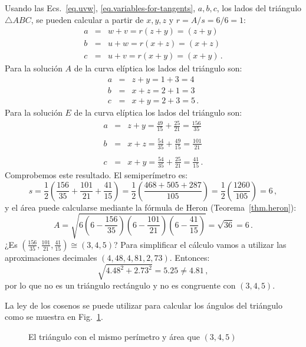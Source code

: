Usando las Ecs.~\ref{eq.uvw}, \ref{eq.variables-for-tangents}, $a,b,c$, los lados del triángulo $\triangle ABC$, se pueden calcular a partir de $x,y,z$ y $r=A/s=6/6=1$:
\begin{eqnarray*}
a&=&w+v = r(z+y)=(z+y)\\
b&=&u+w= r(x+z)=(x+z)\\
c&=&u+v=r(x+y)=(x+y)\,.
\end{eqnarray*}
Para la solución $A$ de la curva elíptica los lados del triángulo son:
\begin{eqnarray*}
a &=& z+y = 1+3 = 4\\
b &=& x+z = 2+1=3\\
c &=& x+y = 2+3=5\,.
\end{eqnarray*}
Para la solución $E$ de la curva elíptica los lados del triángulo son:
\begin{eqnarray*}
a &=& z+y = \frac{49}{15} + \frac{25}{21} = \frac{156}{35}\\
&&\\
b &=& x+z = \frac{54}{35} + \frac{49}{15} = \frac{101}{21}\\
&&\\
c &=& x+y = \frac{54}{35} + \frac{25}{21} =\frac{41}{15}\,.
\end{eqnarray*}
Comprobemos este resultado. El semiperímetro es:
\[
s=\frac{1}{2}\left(\frac{156}{35} + \frac{101}{21}+\frac{41}{15}\right) = \frac{1}{2}\left(\frac{468+505+287}{105}\right) = \frac{1}{2}\left(\frac{1260}{105}\right)= 6\,,
\]
y el área puede calcularse mediante la fórmula de Heron (Teorema~\ref{thm.heron}):
\[
A= \sqrt{6 \left(6-\frac{156}{35}\right) \left(6-\frac{101}{21}\right) \left(6-\frac{41}{15}\right)}=\sqrt{36} = 6\,.
\]
¿Es $\left(\frac{156}{35}, \frac{101}{21}, \frac{41}{15}\right)\cong(3,4,5)$? Para simplificar el cálculo vamos a utilizar las aproximaciones decimales $(4,48,4,81,2,73)$. Entonces:
\[
\sqrt{4.48^2+2.73^2}=5.25\neq 4.81\,,
\]
por lo que no es un triángulo rectángulo y no es congruente con $(3,4,5)$.

La ley de los cosenos se puede utilizar para calcular los ángulos del triángulo como se muestra en Fig.~\ref{f.not-a-right-triangle}.


\begin{figure}[t]
\begin{center}
\end{center}
\caption{El triángulo con el mismo perímetro y área que $(3,4,5)$}\label{f.not-a-right-triangle}
\end{figure}

